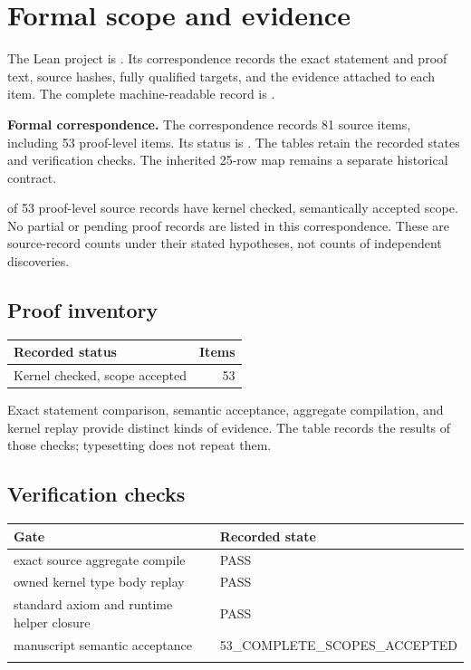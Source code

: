 \section{Formal scope and evidence}\label{sec:current-release}

The Lean project is . Its correspondence records the exact statement and proof text, source hashes, fully qualified targets, and the evidence attached to each item. The complete machine-readable record is .

\textbf{Formal correspondence.} The correspondence records 81 source items, including 53 proof-level items. Its status is . The tables retain the recorded states and verification checks. The inherited 25-row map remains a separate historical contract.
\par{} of 53 proof-level source records have kernel checked, semantically accepted scope. No partial or pending proof records are listed in this correspondence. These are source-record counts under their stated hypotheses, not counts of independent discoveries.


\subsection{Proof inventory}

\begin{tabular}{p{}r}\toprule Recorded status & Items \\ \midrule

Kernel checked, scope accepted & 53 \\

\bottomrule\end{tabular}

Exact statement comparison, semantic acceptance, aggregate compilation, and kernel replay provide distinct kinds of evidence. The table records the results of those checks; typesetting does not repeat them.

\subsection{Verification checks}

\begin{longtable}{p{}p{}}\toprule Gate & Recorded state \\ \midrule\endhead

exact source aggregate compile & PASS \\ \addlinespace

owned kernel type body replay & PASS \\ \addlinespace

standard axiom and runtime helper closure & PASS \\ \addlinespace

manuscript semantic acceptance & 53\_COMPLETE\_SCOPES\_ACCEPTED \\ \addlinespace

\bottomrule\end{longtable}

